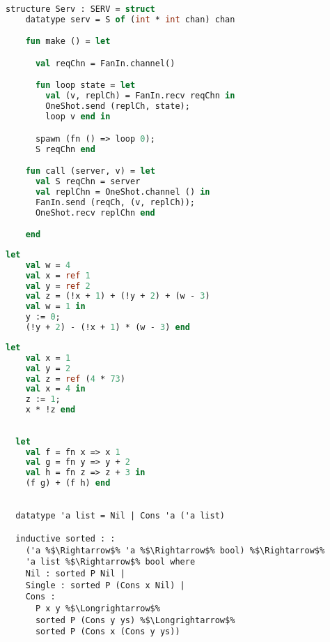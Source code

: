 \documentclass{article}
\begin{document}
\begin{lstlisting}[language=ML, style=codestyle1]
  structure Serv : SERV = struct 
    datatype serv = S of (int * int chan) chan 

    fun make () = let 

      val reqChn = FanIn.channel()

      fun loop state = let
        val (v, replCh) = FanIn.recv reqChn in 
        OneShot.send (replCh, state);
        loop v end in

      spawn (fn () => loop 0);
      S reqChn end 

    fun call (server, v) = let 
      val S reqChn = server
      val replChn = OneShot.channel () in 
      FanIn.send (reqCh, (v, replCh));
      OneShot.recv replChn end

    end
  \end{lstlisting}

\begin{lstlisting}[language=ML, style=codestyle1]
  let
    val w = 4
    val x = ref 1
    val y = ref 2
    val z = (!x + 1) + (!y + 2) + (w - 3)
    val w = 1 in
    y := 0;
    (!y + 2) - (!x + 1) * (w - 3) end
  \end{lstlisting}

\begin{lstlisting}[language=ML, style=codestyle1]
  let 
    val x = 1  
    val y = 2
    val z = ref (4 * 73)
    val x = 4 in 
    z := 1; 
    x * !z end
  \end{lstlisting}

\begin{lstlisting}[language=ML, style=codestyle1]

  let 
    val f = fn x => x 1
    val g = fn y => y + 2
    val h = fn z => z + 3 in 
    (f g) + (f h) end

\end{lstlisting}


\begin{lstlisting}[style=codestyle1, escapechar=\%]

  datatype 'a list = Nil | Cons 'a ('a list)

  inductive sorted : :
    ('a %$\Rightarrow$% 'a %$\Rightarrow$% bool) %$\Rightarrow$%
    'a list %$\Rightarrow$% bool where
    Nil : sorted P Nil |
    Single : sorted P (Cons x Nil) |
    Cons :
      P x y %$\Longrightarrow$%
      sorted P (Cons y ys) %$\Longrightarrow$%
      sorted P (Cons x (Cons y ys))
  \end{lstlisting}
\end{document}
